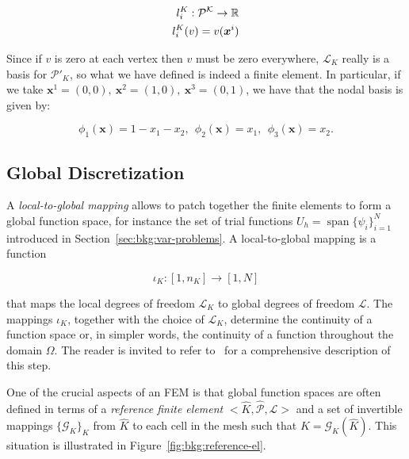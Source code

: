 \begin{equation}
\centering
\begin{split}
l_i^K : \mathcal{P^K} \rightarrow \mathbb{R} \\
l_i^K(v) = v(\boldsymbol{x}^i)
\end{split}
\end{equation}

Since if $v$ is zero at each vertex then $v$ must be zero everywhere, $\mathcal{L}_K$ really is a basis for $\mathcal{P}'_K$, so what we have defined is indeed a finite element. In particular, if we take $\boldsymbol{x}^1 = (0, 0),\ \boldsymbol{x}^2 = (1,0),\ \boldsymbol{x}^3 = (0,1)$, we have that the nodal basis is given by:

\begin{equation}
\phi_1(\boldsymbol{x}) = 1 - x_1 - x_2,\ \ \phi_2(\boldsymbol{x}) = x_1,\ \ \phi_3(\boldsymbol{x}) = x_2.
\end{equation}


\subsection{Global Discretization}
\label{sec:bkg:refel}
A {\em local-to-global mapping} allows to patch together the finite elements to form a global function space, for instance the set of trial functions $U_h = \operatorname{span}\lbrace \psi_i \rbrace_{i=1}^N$ introduced in Section~\ref{sec:bkg:var-problems}. A local-to-global mapping is a function

\begin{equation}
\iota_K : [1,n_K] \rightarrow [1,N]
\end{equation}

that maps the local degrees of freedom $\mathcal{L}_K$ to global degrees of freedom $\mathcal{L}$. The mappings $\iota_K$, together with the choice of $\mathcal{L}_K$, determine the continuity of a function space or, in simpler words, the continuity of a function throughout the domain $\Omega$. The reader is invited to refer to~\cite{Fenics} for a comprehensive description of this step.

One of the crucial aspects of an FEM is that global function spaces are often defined in terms of a {\em reference finite element} ${<}\hat{K}, \hat{\mathcal{P}}, \hat{\mathcal{L}}{>}$ and a set of invertible mappings $\lbrace \mathcal{G}_K\rbrace_{K}$ from $\hat{K}$ to each cell in the mesh such that $K = \mathcal{G}_K(\hat{K})$.  This situation is illustrated in Figure~\ref{fig:bkg:reference-el}.

